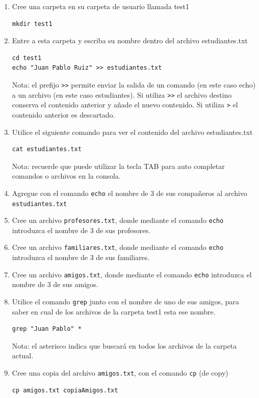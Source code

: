 \documentclass[10pt,letterpaper]{article}
\begin{document}
\begin{enumerate}
\item Cree una carpeta en su carpeta de usuario llamada test1
\begin{verbatim}
mkdir test1
\end{verbatim}

\item Entre a esta carpeta y escriba su nombre dentro del archivo estudiantes.txt
\begin{verbatim}
cd test1
echo "Juan Pablo Ruiz" >> estudiantes.txt
\end{verbatim}
Nota: el prefijo \verb|>>| permite enviar la salida de un comando (en este caso echo) a un archivo (en este caso estudiantes). Si utiliza \verb|>>| el archivo destino conserva el contenido anterior y añade el nuevo contenido. Si utiliza \verb|>| el contenido anterior es descartado. 

\item Utilice el siguiente comando para ver el contenido del archivo estudiantes.txt
\begin{verbatim}
cat estudiantes.txt
\end{verbatim}
Nota: recuerde que puede utilizar la tecla TAB para auto completar comandos o archivos en la consola. 

\item Agregue con el comando \verb|echo| el nombre de 3 de sus compañeros al archivo \verb|estudiantes.txt|

\item Cree un archivo \verb|profesores.txt|, donde mediante el comando \verb|echo| introduzca el nombre de 3 de sus profesores.

\item Cree un archivo \verb|familiares.txt|, donde mediante el comando \verb|echo| introduzca el nombre de 3 de sus familiares.

\item Cree un archivo \verb|amigos.txt|, donde mediante el comando \verb|echo| introduzca el nombre de 3 de sus amigos.

\item Utilice el comando \verb|grep| junto con el nombre de uno de sus amigos, para saber en cual de los archivos de la carpeta test1 esta ese nombre. 
\begin{verbatim}
grep "Juan Pablo" *
\end{verbatim}
Nota: el asterisco indica que buscará en todos los archivos de la carpeta actual.

\item Cree una copia del archivo \verb|amigos.txt|, con el comando \verb|cp| (de copy)
\begin{verbatim}
cp amigos.txt copiaAmigos.txt
\end{verbatim}


\end{enumerate}
\end{document}
